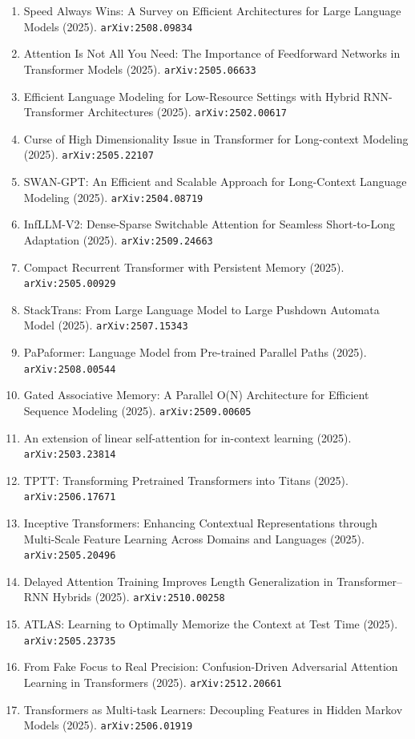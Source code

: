 \documentclass[11pt]{article}
\begin{document}
\begin{enumerate}
  \item Speed Always Wins: A Survey on Efficient Architectures for Large Language Models (2025). \texttt{arXiv:2508.09834}
  \item Attention Is Not All You Need: The Importance of Feedforward Networks in Transformer Models (2025). \texttt{arXiv:2505.06633}
  \item Efficient Language Modeling for Low-Resource Settings with Hybrid
  RNN-Transformer Architectures (2025). \texttt{arXiv:2502.00617}
  \item Curse of High Dimensionality Issue in Transformer for Long-context Modeling (2025). \texttt{arXiv:2505.22107}
  \item SWAN-GPT: An Efficient and Scalable Approach for Long-Context Language
  Modeling (2025). \texttt{arXiv:2504.08719}
  \item InfLLM-V2: Dense-Sparse Switchable Attention for Seamless Short-to-Long Adaptation (2025). \texttt{arXiv:2509.24663}
  \item Compact Recurrent Transformer with Persistent Memory (2025). \texttt{arXiv:2505.00929}
  \item StackTrans: From Large Language Model to Large Pushdown Automata Model (2025). \texttt{arXiv:2507.15343}
  \item PaPaformer: Language Model from Pre-trained Parallel Paths (2025). \texttt{arXiv:2508.00544}
  \item Gated Associative Memory: A Parallel O(N) Architecture for Efficient Sequence Modeling (2025). \texttt{arXiv:2509.00605}
  \item An extension of linear self-attention for in-context learning (2025). \texttt{arXiv:2503.23814}
  \item TPTT: Transforming Pretrained Transformers into Titans (2025). \texttt{arXiv:2506.17671}
  \item Inceptive Transformers: Enhancing Contextual Representations through Multi-Scale Feature Learning Across Domains and Languages (2025). \texttt{arXiv:2505.20496}
  \item Delayed Attention Training Improves Length Generalization in Transformer--RNN Hybrids (2025). \texttt{arXiv:2510.00258}
  \item ATLAS: Learning to Optimally Memorize the Context at Test Time (2025). \texttt{arXiv:2505.23735}
  \item From Fake Focus to Real Precision: Confusion-Driven Adversarial Attention Learning in Transformers (2025). \texttt{arXiv:2512.20661}
  \item Transformers as Multi-task Learners: Decoupling Features in Hidden Markov Models (2025). \texttt{arXiv:2506.01919}

\end{enumerate}
\end{document}
